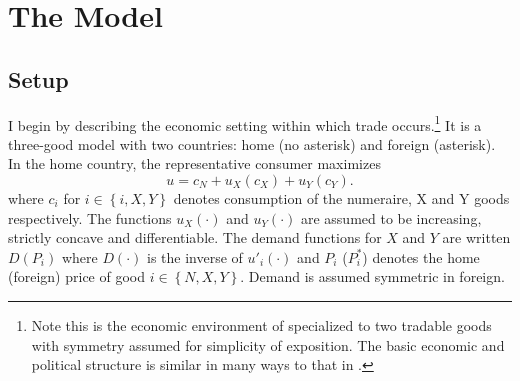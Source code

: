 \documentclass[12pt,titlepage]{article}
\begin{document}
\section{The Model}
\label{sec:stage}

\subsection{Setup}
\label{sec:economic}
I begin by describing the economic setting within which trade occurs.\footnote{Note this is the economic environment of \Textcite{gh95} specialized to two tradable goods with symmetry assumed for simplicity of exposition. The basic economic and political structure is similar in many ways to that in \Textcite{buzard2013b}.} It is a three-good model with two countries: home (no asterisk) and foreign (asterisk). In the home country, the representative consumer maximizes
\[
  u = c_N + u_X(c_X) + u_Y(c_Y).
\]
where $c_i$ for $i \in \left\{i,X,Y\right\}$ denotes consumption of the numeraire, X and Y goods respectively. The functions $u_X(\cdot)$ and $u_Y(\cdot)$ are assumed to be increasing, strictly concave and differentiable. The demand functions for $X$ and $Y$ are written $D(P_i)$ where $D(\cdot)$ is the inverse of $u'_i(\cdot)$ and $P_i$ ($P_i^*$) denotes the home (foreign) price of good $i \in \left\{N,X,Y\right\}$. Demand is assumed symmetric in foreign.
\end{document}
